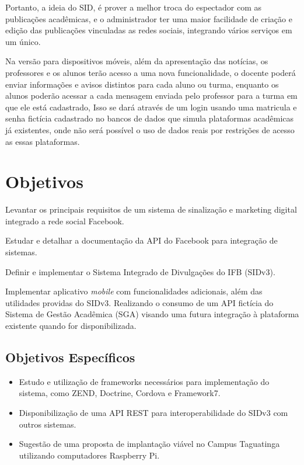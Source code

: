 Portanto, a ideia do SID, é prover a melhor troca do espectador com as publicações acadêmicas, e o administrador ter uma maior facilidade de criação e edição das publicações vinculadas as redes sociais, integrando vários serviços em um único.

Na versão para dispositivos móveis, além da apresentação das notícias, os professores e os alunos terão acesso a uma nova funcionalidade, o docente poderá enviar informações e avisos distintos para cada aluno ou turma, enquanto os alunos poderão acessar a cada mensagem enviada pelo professor para a turma em que ele está cadastrado, Isso se dará através de um login usando uma matricula e senha fictícia cadastrado no bancos de dados que simula plataformas acadêmicas já existentes, onde não será possível o uso de dados reais por restrições de acesso as essas plataformas.

\section{Objetivos}
Levantar os principais requisitos de um sistema de sinalização e marketing digital integrado a rede social Facebook.

Estudar e detalhar a documentação da API do Facebook para integração de sistemas.

Definir e implementar o Sistema Integrado de Divulgações do IFB (SIDv3).

Implementar aplicativo \textit{mobile} com funcionalidades adicionais, além das utilidades providas do SIDv3. Realizando o consumo de um API fictícia do Sistema de Gestão Acadêmica (SGA) visando uma futura integração à plataforma existente quando for disponibilizada.

\subsection{Objetivos Específicos}
	 \begin{itemize}
	\item Estudo e utilização de frameworks necessários para implementação do sistema, como ZEND, Doctrine, Cordova e Framework7.
	 	
	\item Disponibilização de uma API REST para interoperabilidade do SIDv3 com outros sistemas.
	
	\item Sugestão de uma proposta de implantação viável no Campus Taguatinga utilizando computadores Raspberry Pi.
	\end{itemize}
	
